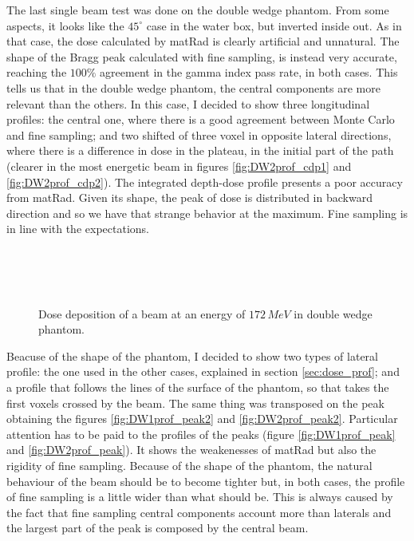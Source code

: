 \documentclass[12pt, a4paper, twoside]{book}
\begin{document}
The last single beam test was done on the double wedge phantom. From some aspects, it looks like the $45^\circ$ case in the water box, but inverted inside out. As in that case, the dose calculated by matRad is clearly artificial and unnatural. The shape of the Bragg peak calculated with fine sampling, is instead very accurate, reaching the $100\%$ agreement in the gamma index pass rate, in both cases. 
This tells us that in the double wedge phantom, the central components are more relevant than the others.
In this case, I decided to show three longitudinal profiles: the central one, where there is a good agreement between Monte Carlo and fine sampling; and two shifted of three voxel in opposite lateral directions, where there is a difference in dose in the plateau, in the initial part of the path (clearer in the most energetic beam in figures \ref{fig:DW2prof_cdp1} and \ref{fig:DW2prof_cdp2}).
The integrated depth-dose profile presents a poor accuracy from matRad. Given its shape, the peak of dose is distributed in backward direction and so we have that strange behavior at the maximum. Fine sampling is in line with the expectations. 
\begin{figure}[!t]
\centering
{}\\ 
\\
\\
\caption{Dose deposition of a beam at an energy of $172\,MeV$ in double wedge phantom.}
\label{fig:DW2}
\end{figure}
Beacuse of the shape of the phantom, I decided to show two types of lateral profile: the one used in the other cases, explained in section \ref{sec:dose_prof}; and a profile that follows the lines of the surface of the phantom, so that takes the first voxels crossed by the beam. The same thing was transposed on the peak obtaining the figures \ref{fig:DW1prof_peak2} and \ref{fig:DW2prof_peak2}.
Particular attention has to be paid to the profiles of the peaks (figure \ref{fig:DW1prof_peak} and \ref{fig:DW2prof_peak}). It shows the weakenesses of matRad but also the rigidity of fine sampling. Because of the shape of the phantom, the natural behaviour of the beam should be to become tighter but, in both cases, the profile of fine sampling is a little wider than what should be. This is always caused by the fact that fine sampling central components account more than laterals and the largest part of the peak is composed by the central beam.
\end{document}
